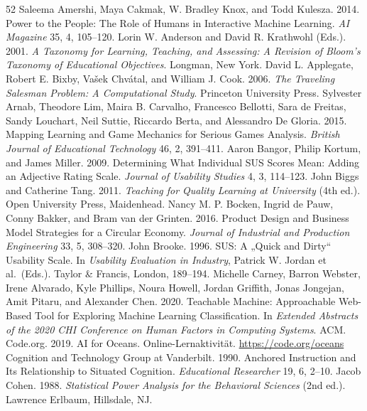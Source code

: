 \documentclass[sigconf,nonacm]{acmart}
\begin{document}
\begin{thebibliography}{52}
\small
{} Saleema Amershi, Maya Cakmak, W. Bradley Knox, and Todd Kulesza. 2014. Power to the People: The Role of Humans in Interactive Machine Learning. \textit{AI Magazine} 35, 4, 105--120.
 Lorin W. Anderson and David R. Krathwohl (Eds.). 2001. \textit{A Taxonomy for Learning, Teaching, and Assessing: A Revision of Bloom's Taxonomy of Educational Objectives}. Longman, New York.
 David L. Applegate, Robert E. Bixby, Vašek Chvátal, and William J. Cook. 2006. \textit{The Traveling Salesman Problem: A Computational Study}. Princeton University Press.
 Sylvester Arnab, Theodore Lim, Maira B. Carvalho, Francesco Bellotti, Sara de Freitas, Sandy Louchart, Neil Suttie, Riccardo Berta, and Alessandro De Gloria. 2015. Mapping Learning and Game Mechanics for Serious Games Analysis. \textit{British Journal of Educational Technology} 46, 2, 391--411.
 Aaron Bangor, Philip Kortum, and James Miller. 2009. Determining What Individual SUS Scores Mean: Adding an Adjective Rating Scale. \textit{Journal of Usability Studies} 4, 3, 114--123.
 John Biggs and Catherine Tang. 2011. \textit{Teaching for Quality Learning at University} (4th ed.). Open University Press, Maidenhead.
 Nancy M. P. Bocken, Ingrid de Pauw, Conny Bakker, and Bram van der Grinten. 2016. Product Design and Business Model Strategies for a Circular Economy. \textit{Journal of Industrial and Production Engineering} 33, 5, 308--320.
 John Brooke. 1996. SUS: A „Quick and Dirty“ Usability Scale. In \textit{Usability Evaluation in Industry}, Patrick W. Jordan et al.\ (Eds.). Taylor \& Francis, London, 189--194.
 Michelle Carney, Barron Webster, Irene Alvarado, Kyle Phillips, Noura Howell, Jordan Griffith, Jonas Jongejan, Amit Pitaru, and Alexander Chen. 2020. Teachable Machine: Approachable Web-Based Tool for Exploring Machine Learning Classification. In \textit{Extended Abstracts of the 2020 CHI Conference on Human Factors in Computing Systems}. ACM.
 Code.org. 2019. AI for Oceans. Online-Lernaktivität. \url{https://code.org/oceans}
 Cognition and Technology Group at Vanderbilt. 1990. Anchored Instruction and Its Relationship to Situated Cognition. \textit{Educational Researcher} 19, 6, 2--10.
 Jacob Cohen. 1988. \textit{Statistical Power Analysis for the Behavioral Sciences} (2nd ed.). Lawrence Erlbaum, Hillsdale, NJ.

\end{thebibliography}
\end{document}
